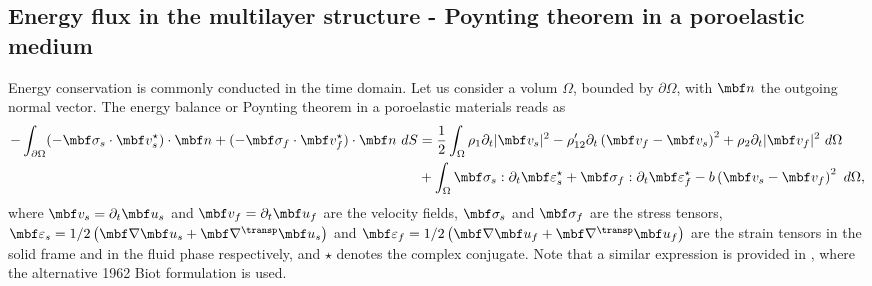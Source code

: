 \subsection{Energy flux in the multilayer structure - Poynting theorem in a poroelastic medium}
\label{app:poynting}

Energy conservation is commonly conducted in the time domain. Let us consider a volum $\Omega$, bounded by $\partial \Omega$, with $\mbf n$ the outgoing normal vector. The energy balance or Poynting theorem in a poroelastic materials reads as \cite{biot1956,dazel2008}
\begin{equation}
        \begin{aligned} 
           - \int_{\partial \Omega} (-\mbf \sigma_s \cdot\mbf v_s^\star)\cdot  \mbf n +  (-\mbf \sigma_f \cdot \mbf v_f^\star) \cdot \mbf n ~dS
            &= \frac {1} {2} \int_\Omega \rho_1 \partial_t |\mbf v_s|^2 - \rho_{12}'\partial_t  \left(\mbf v_f - \mbf v_s \right)^2 + \rho_2 \partial_t |\mbf v_f|^2~d\Omega \\
            &+ \int_\Omega  \mbf \sigma_s : \partial_t\mbf \varepsilon_s^\star + \mbf \sigma_f :\partial_t\mbf \varepsilon_f^\star - b \left(\mbf v_s - \mbf v_f\right)^2 ~d\Omega,
        \end{aligned}
        \label{eq:poynt_energy_balance}
    \end{equation}
where $\mbf v_s=\partial_t \mbf u_s$ and $\mbf v_f=\partial_t \mbf u_f$ are the velocity fields, $\mbf \sigma_s$ and $\mbf \sigma_f$ are the stress tensors, $\mbf \varepsilon_s = 1 / 2 \left( \mbf \nabla \mbf u_s + \mbf \nabla^\transp \mbf u_s \right)$ and $\mbf \varepsilon_f = 1 / 2 \left( \mbf \nabla \mbf u_f + \mbf \nabla^\transp \mbf u_f \right)$ are the strain tensors in the solid frame and in the fluid phase respectively, and $\star$ denotes the complex conjugate. Note that a similar expression is provided in \cite{carcione1996}, where the alternative 1962 Biot formulation is used.

